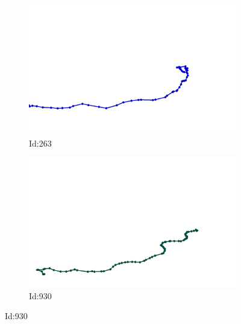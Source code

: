 \documentclass[12pt,twoside]{report}
\begin{document}
\begin{figure}
\centering
\begin{subfigure}[b]{0.20\textwidth}
\centering
\includegraphics[width=\textwidth]{../../trajectories/263.png}
\caption{Id:263}
\end{subfigure}
\begin{subfigure}[b]{0.20\textwidth}
\centering
\includegraphics[width=\textwidth]{../../trajectories/930.png}
\caption{Id:930}
\end{subfigure}
\end{figure}
\end{document}
